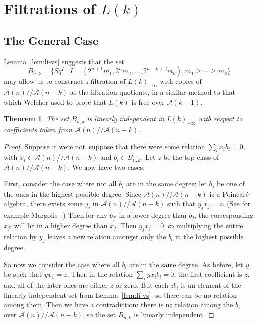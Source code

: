 \documentclass{article}
\newcommand{\A}{\mathcal{A}}
\newcommand{\mmod}{/\!/\!}
\newcommand{\Lkm}[1][k]{L{(#1)}_{-\infty}}
\newtheorem{thm}{Theorem}
\begin{document}
\section{Filtrations of \boldmath$L(k)$}\label{sec:lk}

\subsection{The General Case}

Lemma~\ref{lem:li-vs} suggests that the set
\[ B_{n,k} = \{Sq^I \mid I = (2^{n+1}m_1, 2^n m_2, \ldots, 2^{n-k+2}m_k), m_1 \geq \cdots \geq m_k \} \]
may allow us to construct a filtration of $\Lkm$ with copies of $\A(n)\mmod\A(n-k)$ as the filtration quotients, in a similar method to that which Welcher used to prove that $L(k)$ is free over $\A(k-1)$.

\begin{thm}\label{thm:li-module}
  The set $B_{n,k}$ is linearly independent in $\Lkm$ with respect to coefficients taken from $\A(n)\mmod\A(n-k)$.
\end{thm}

\begin{proof}
  Suppose it were not: suppose that there were some relation $\sum_i x_i b_i = 0$, with $x_i\in\A(n)\mmod\A(n-k)$ and $b_i\in B_{n,k}$.  Let $z$ be the top class of $\A(n)\mmod\A(n-k)$.  We now have two cases.

  First, consider the case where not all $b_i$ are in the same degree; let $b_j$ be one of the ones in the highest possible degree.  Since $\A(n)\mmod\A(n-k)$ is a Poincar\'e algebra, there exists some $y_j$ in $\A(n)\mmod\A(n-k)$ such that $y_j x_j = z$.  (See for example Margolis~\cite{margolis}.)  Then for any $b_{j'}$ in a lower degree than $b_j$, the corresponding $x_{j'}$ will be in a higher degree than $x_j$.  Then $y_j x_j = 0$, so multiplying the entire relation by $y_j$ leaves a new relation amongst only the $b_i$ in the highest possible degree.

  So now we consider the case where all $b_i$ are in the same degree.  As before, let $y$ be such that $y x_1 = z$.  Then in the relation $\sum_i y x_i b_i = 0$, the first coefficient is $z$, and all of the later ones are either $z$ or zero.  But each $z b_i$ is an element of the linearly independent set from Lemma~\ref{lem:li-vs}, so there can be no relation among them.  Then we have a contradiction: there is no relation among the $b_i$ over $\A(n)\mmod\A(n-k)$, so the set $B_{n,k}$ is linearly independent.
\end{proof}
\end{document}
